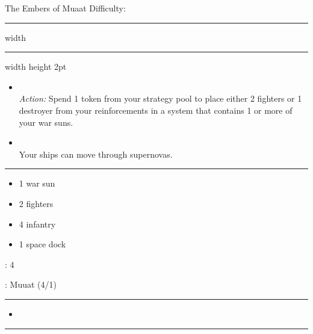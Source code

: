 \newpage
{\handel\Huge The Embers of Muaat} \hfill {\Large Difficulty: \hard} \vspace{-4pt}\\
\hrule width \hsize \kern 1mm \hrule width \hsize height 2pt


\begin{multicols}{2}


\begin{itemize}
\item {}\\
\emph{Action:}
Spend 1 token from your strategy pool to place either 2 fighters or 1 destroyer from your reinforcements in a system that contains 1 or more of your war suns.
\item {}\\
Your ships can move through supernovas.
\end{itemize}


\vspace{-10pt}\rule{\hsize}{0.4pt}\vspace{5pt}


\vspace{-5pt}
\begin{multicols}{2}
\begin{itemize}
\item 1 war sun
\item 2 fighters
\item 4 infantry
\item 1 space dock
\end{itemize}
\end{multicols}

\vspace{-5pt}
: 4

\vspace{2pt}
: Muuat (4/1)

\rule{\hsize}{0.4pt}\vspace{5pt}


\begin{itemize}
\item \plasma
\end{itemize}

\vspace{-10pt}\rule{\hsize}{0.4pt}\vspace{5pt}


\end{multicols}
